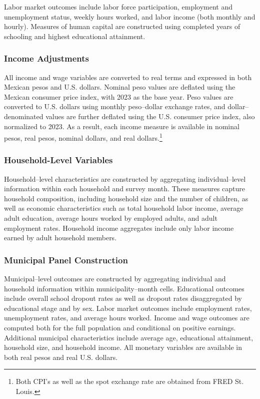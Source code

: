 \documentclass[12pt,letter,english,intoc,bibliography=totoc,index=totoc,BCOR10mm,captions=tableheading,nottitlepage,fleqn]{article}
\theoremstyle{break}
\begin{document}
Labor market outcomes include labor force participation, employment and unemployment status, weekly hours worked, and labor income (both monthly and hourly). Measures of human capital are constructed using completed years of schooling and highest educational attainment.

\subsubsection*{Income Adjustments}
All income and wage variables are converted to real terms and expressed in both Mexican pesos and U.S. dollars. Nominal peso values are deflated using the Mexican consumer price index, with 2023 as the base year. Peso values are converted to U.S. dollars using monthly peso--dollar exchange rates, and dollar--denominated values are further deflated using the U.S. consumer price index, also normalized to 2023. As a result, each income measure is available in nominal pesos, real pesos, nominal dollars, and real dollars.\footnote{Both CPI's as well as the spot exchange rate are obtained from FRED St. Louis.}

\subsubsection*{Household-Level Variables}
Household--level characteristics are constructed by aggregating individual--level information within each household and survey month. These measures capture household composition, including household size and the number of children, as well as economic characteristics such as total household labor income, average adult education, average hours worked by employed adults, and adult employment rates. Household income aggregates include only labor income earned by adult household members.

\subsubsection*{Municipal Panel Construction}
Municipal--level outcomes are constructed by aggregating individual and household information within municipality--month cells. Educational outcomes include overall school dropout rates as well as dropout rates disaggregated by educational stage and by sex. Labor market outcomes include employment rates, unemployment rates, and average hours worked. Income and wage outcomes are computed both for the full population and conditional on positive earnings. Additional municipal characteristics include average age, educational attainment, household size, and household income. All monetary variables are available in both real pesos and real U.S. dollars.
\end{document}
